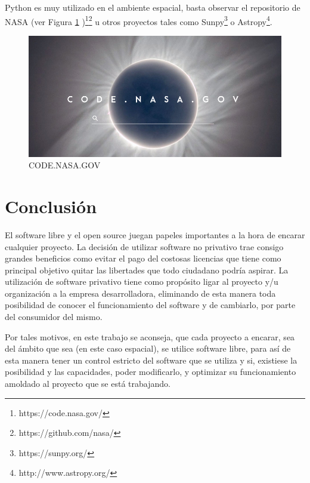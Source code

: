 \documentclass[12pt]{article}
\begin{document}
Python es muy utilizado en el ambiente espacial, basta observar el repositorio de NASA (ver Figura \ref{fig:nasa} )\footnote{https://code.nasa.gov/}\footnote{https://github.com/nasa/} u otros proyectos tales como Sunpy\footnote{https://sunpy.org/} o Astropy\footnote{http://www.astropy.org/}.

\begin{figure}[H]
	\centering
	\includegraphics[width=0.7\linewidth]{NASA}
	\caption{CODE.NASA.GOV}
	\label{fig:nasa}
\end{figure}

\section{Conclusión}
El software libre y el open source juegan papeles importantes a la hora de encarar cualquier proyecto. La decisión de utilizar software no privativo trae consigo grandes beneficios como evitar el pago del costosas licencias que tiene como principal objetivo quitar las libertades que todo ciudadano podría aspirar. La utilización de software privativo tiene como propósito ligar al proyecto y/u organización a la empresa desarrolladora, eliminando de esta manera toda posibilidad de conocer el funcionamiento del software y de cambiarlo, por parte del consumidor del mismo. 

Por tales motivos, en este trabajo se aconseja, que cada proyecto a encarar, sea del ámbito que sea (en este caso espacial), se utilice software libre, para así de esta manera tener un control estricto del software que se utiliza y si, existiese la posibilidad y las capacidades, poder modificarlo, y optimizar su funcionamiento amoldado al proyecto que se está trabajando.

\newpage



\end{document}
